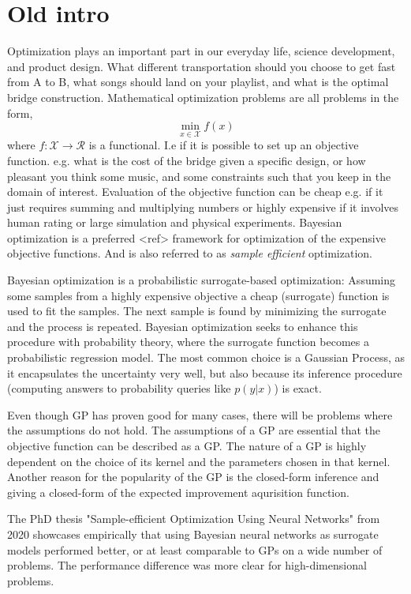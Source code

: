 

\section{Old intro}
Optimization plays an important part in our everyday life, science development, and product design.
What different transportation should you choose to get fast from A to B, what songs should
land on your playlist, and what is the optimal bridge construction. Mathematical optimization problems 
are all problems in the form, 
$$\min_{x\in \mathcal{X}} f(x)$$ where $f: \mathcal{X} \rightarrow \mathcal{R}$ is a functional. I.e
if it is possible to set up an objective function. e.g. what is the cost of the bridge given a
specific design, or how pleasant you think some music, and some constraints such that you keep in
the domain of interest. Evaluation of the objective function can be cheap e.g. if it just requires
summing and multiplying numbers or highly expensive if it involves human rating or large simulation
and physical experiments. Bayesian optimization is a preferred <ref> framework for optimization of
the expensive objective functions. And is also referred to as \textit{sample efficient}
optimization. 

Bayesian optimization is a probabilistic surrogate-based optimization: Assuming some samples from a
highly expensive objective a cheap (surrogate) function is used to fit the samples. The next sample
is found by minimizing the surrogate and the process is repeated. Bayesian optimization seeks to
enhance this procedure with probability theory, where the surrogate function becomes a probabilistic
regression model. The most common choice is a Gaussian Process, as it encapsulates the uncertainty very well,
but also because its inference procedure (computing answers to probability queries like $p(y|x)$) is exact.

Even though GP has proven good for many cases, there will be problems where the assumptions do not hold. 
The assumptions of a GP are essential that the objective function can be described as a GP.
The nature of a GP is highly dependent on the choice of its kernel and the parameters chosen in that kernel. 
Another reason for the popularity of the GP is the closed-form inference and giving a closed-form of the 
expected improvement aqurisition function. 

The PhD thesis "Sample-efficient Optimization Using Neural Networks" from 2020 \cite{PhDthesis}
showcases empirically that using Bayesian neural networks as surrogate models performed better,
or at least comparable to GPs on a wide number of problems. The performance difference was more
clear for high-dimensional problems. 

